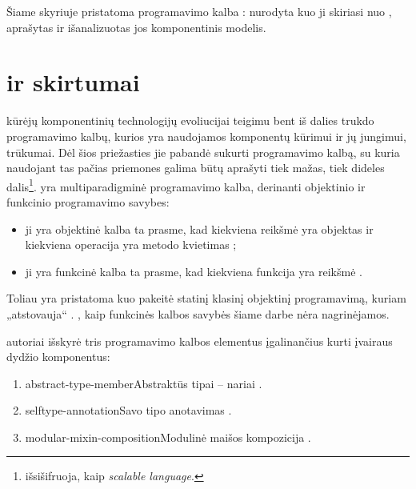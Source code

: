 
Šiame skyriuje pristatoma programavimo kalba :
nurodyta kuo ji skiriasi nuo , aprašytas
ir išanalizuotas jos komponentinis modelis.

\section{ ir  skirtumai}

 kūrėjų \cite[1]{scala-overview} komponentinių
technologijų evoliucijai teigimu bent iš dalies trukdo programavimo
kalbų, kurios yra naudojamos komponentų kūrimui ir jų jungimui,
trūkumai. Dėl šios priežasties jie pabandė sukurti programavimo
kalbą, su kuria naudojant tas pačias priemones galima būtų aprašyti
tiek mažas, tiek dideles dalis\footnote{ išsišifruoja,
kaip \emph{scalable language}.}.  yra multiparadigminė
programavimo kalba, derinanti objektinio ir funkcinio programavimo
savybes:
\begin{itemize}
  \item ji yra objektinė kalba ta prasme, kad kiekviena reikšmė
     yra objektas ir kiekviena operacija yra metodo kvietimas
    \cite[3]{scala-overview};
  \item ji yra funkcinė kalba ta prasme, kad kiekviena funkcija yra
    reikšmė .
\end{itemize}
Toliau yra pristatoma kuo  pakeitė statinį klasinį
objektinį programavimą, kuriam „atstovauja“ .
, kaip funkcinės kalbos savybės šiame darbe nėra
nagrinėjamos.

 autoriai \cite{scalable-component-abstractions}
išskyrė tris programavimo kalbos elementus įgalinančius kurti įvairaus
dydžio  komponentus:
\begin{enumerate}
  \item \gls{abstract-type-member}{Abstraktūs tipai – nariai}
    .
  \item \gls{selftype-annotation}{Savo tipo anotavimas}
    .
  \item \gls{modular-mixin-composition}{Modulinė maišos kompozicija}
    .
\end{enumerate}


